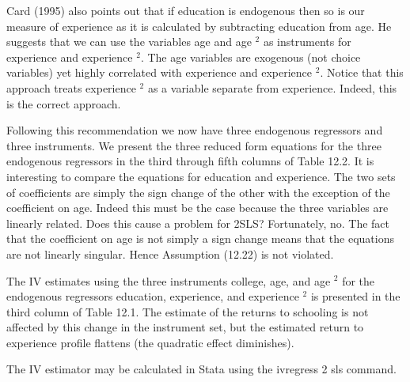 \documentclass[10pt]{article}
\begin{document}
Card (1995) also points out that if education is endogenous then so is our measure of experience as it is calculated by subtracting education from age. He suggests that we can use the variables age and age ${ }^{2}$ as instruments for experience and experience ${ }^{2}$. The age variables are exogenous (not choice variables) yet highly correlated with experience and experience ${ }^{2}$. Notice that this approach treats experience ${ }^{2}$ as a variable separate from experience. Indeed, this is the correct approach.

Following this recommendation we now have three endogenous regressors and three instruments. We present the three reduced form equations for the three endogenous regressors in the third through fifth columns of Table 12.2. It is interesting to compare the equations for education and experience. The two sets of coefficients are simply the sign change of the other with the exception of the coefficient on age. Indeed this must be the case because the three variables are linearly related. Does this cause a problem for 2SLS? Fortunately, no. The fact that the coefficient on age is not simply a sign change means that the equations are not linearly singular. Hence Assumption (12.22) is not violated.

The IV estimates using the three instruments college, age, and age ${ }^{2}$ for the endogenous regressors education, experience, and experience ${ }^{2}$ is presented in the third column of Table 12.1. The estimate of the returns to schooling is not affected by this change in the instrument set, but the estimated return to experience profile flattens (the quadratic effect diminishes).

The IV estimator may be calculated in Stata using the ivregress 2 sls command.
\end{document}
